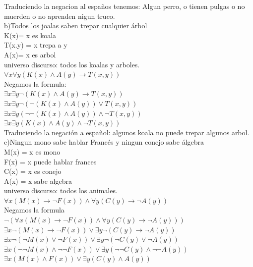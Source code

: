 \documentclass[paper=letter, fontsize=12pt]{scrartcl}
\begin{document}
Traduciendo la negacion al españos tenemos: Algun perro, o tienen pulgas o no muerden o no aprenden nigun truco.\\

b)Todos los joalas saben trepar cualquier árbol\\
K(x)= x es koala\\
T(x.y) = x trepa a y\\
A(x)= x es arbol\\
universo discurso: todos los koalas y arboles.\\
$\forall x\forall y(K(x)\wedge A(y)\rightarrow T(x,y))$\\

Negamos la formula:\\
$\exists x \exists y\neg(K(x)\wedge A(y)\rightarrow T(x,y))$\\
$\exists x \exists y\neg(\neg(K(x)\wedge A(y))\vee T(x,y))$\\
$\exists x \exists y(\neg\neg(K(x)\wedge A(y))\wedge \neg T(x,y))$\\
$\exists x \exists y(K(x)\wedge A(y)\wedge \neg T(x,y))$\\

Traduciendo la negación a español: algunos koala no puede trepar algunos arbol.\\

c)Ningun mono sabe hablar Francés y ningun conejo sabe álgebra\\
M(x) = x es mono\\
F(x) = x puede hablar frances\\
C(x) = x es conejo\\
A(x) = x sabe algebra\\
universo discurso: todos los animales.\\
$\forall x(M(x)\rightarrow \neg F(x)) \wedge \forall y(C(y)\rightarrow \neg A(y))$\\

Negamos la formula\\
$\neg(\forall x(M(x)\rightarrow \neg F(x)) \wedge \forall y(C(y)\rightarrow \neg A(y)))$\\
$\exists x\neg(M(x)\rightarrow \neg F(x)) \vee \exists y\neg(C(y)\rightarrow \neg A(y))$\\
$\exists x\neg(\neg M(x)\vee \neg F(x)) \vee \exists y\neg(\neg C(y)\vee \neg A(y))$\\
$\exists x(\neg\neg M(x)\wedge \neg\neg F(x)) \vee \exists y(\neg\neg C(y)\wedge \neg\neg A(y))$\\
$\exists x( M(x)\wedge F(x)) \vee \exists y( C(y)\wedge A(y))$\\
\end{document}
